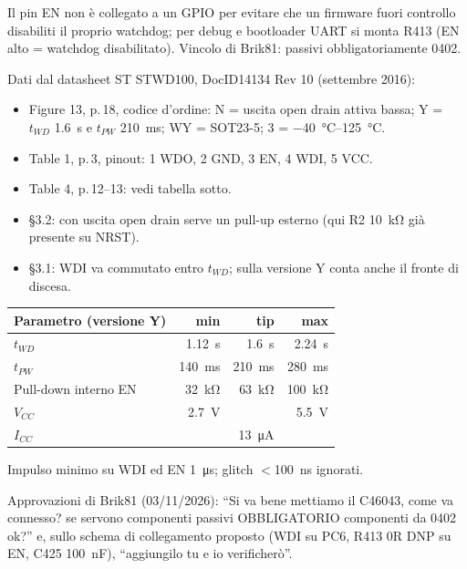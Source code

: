 Il pin EN non è collegato a un GPIO per evitare che un firmware fuori controllo disabiliti il proprio watchdog; per debug e bootloader UART si monta R413 (EN alto = watchdog disabilitato). Vincolo di Brik81: passivi obbligatoriamente 0402.

Dati dal datasheet ST STWD100, DocID14134 Rev 10 (settembre 2016):
\begin{itemize}
\item Figure 13, p.\,18, codice d'ordine: N = uscita open drain attiva bassa; Y = $t_{WD}$ \SI{1,6}{\second} e $t_{PW}$ \SI{210}{\milli\second}; WY = SOT23-5; 3 = \SIrange{-40}{125}{\celsius}.
\item Table 1, p.\,3, pinout: 1 WDO, 2 GND, 3 EN, 4 WDI, 5 VCC.
\item Table 4, p.\,12--13: vedi tabella sotto.
\item §3.2: con uscita open drain serve un pull-up esterno (qui R2 \SI{10}{\kilo\ohm} già presente su NRST).
\item §3.1: WDI va commutato entro $t_{WD}$; sulla versione Y conta anche il fronte di discesa.
\end{itemize}

{\small{}
\begin{tabular}{@{}lrrr@{}}
\toprule
\textbf{Parametro (versione Y)} & \textbf{min} & \textbf{tip} & \textbf{max}\\
\midrule
$t_{WD}$ & \SI{1,12}{\second} & \SI{1,6}{\second} & \SI{2,24}{\second}\\
$t_{PW}$ & \SI{140}{\milli\second} & \SI{210}{\milli\second} & \SI{280}{\milli\second}\\
Pull-down interno EN & \SI{32}{\kilo\ohm} & \SI{63}{\kilo\ohm} & \SI{100}{\kilo\ohm}\\
$V_{CC}$ & \SI{2,7}{\volt} & & \SI{5,5}{\volt}\\
$I_{CC}$ & & \SI{13}{\micro\ampere} & \\
\bottomrule
\end{tabular}}

\medskip
Impulso minimo su WDI ed EN \SI{1}{\micro\second}; glitch $<$\SI{100}{\nano\second} ignorati.

Approvazioni di Brik81 (03/11/2026): \textquotedblleft{}Si va bene mettiamo il C46043, come va connesso? se servono componenti passivi OBBLIGATORIO componenti da 0402 ok?\textquotedblright{} e, sullo schema di collegamento proposto (WDI su PC6, R413 0R DNP su EN, C425 \SI{100}{\nano\farad}), \textquotedblleft{}aggiungilo tu e io verificherò\textquotedblright{}.

